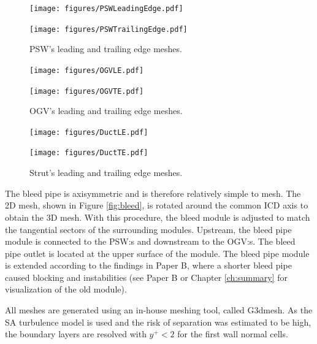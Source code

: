 \begin{figure}[h!]
  \centering
  \begin{minipage}{0.49\columnwidth}
  \texttt{[image: figures/PSWLeadingEdge.pdf]}
  \end{minipage}
  \begin{minipage}{0.49\columnwidth}
  \texttt{[image: figures/PSWTrailingEdge.pdf]}
  \end{minipage}
  \caption{PSW's leading and trailing edge meshes.} \label{fig:meshPSW}
\end{figure}
\begin{figure}[h!]
  \begin{minipage}{0.49\columnwidth}
  \texttt{[image: figures/OGVLE.pdf]}
  \end{minipage}
  \begin{minipage}{0.49\columnwidth}
  \texttt{[image: figures/OGVTE.pdf]}
  \end{minipage}
  \caption{OGV's leading and trailing edge meshes.} \label{fig:meshOGV}
\end{figure}
\begin{figure}[h!]
  \begin{minipage}{0.49\columnwidth}
  \texttt{[image: figures/DuctLE.pdf]}
  \end{minipage}
  \begin{minipage}{0.49\columnwidth}
  \texttt{[image: figures/DuctTE.pdf]}
  \end{minipage}  
  \caption{Strut's leading and trailing edge meshes.} \label{fig:meshDuct}
\end{figure}
The bleed pipe is axisymmetric and is therefore relatively simple to mesh. The 2D mesh, shown in Figure \ref{fig:bleed}, is rotated around the common ICD axis to obtain the 3D mesh. With this procedure, the bleed module is adjusted to match the tangential sectors of the surrounding modules. Upstream, the bleed pipe module is connected to the PSW:s and downstream to the OGV:s. The bleed pipe outlet is located at the upper surface of the module. The bleed pipe module is extended according to the findings in Paper B, where a shorter bleed pipe caused blocking and instabilities (see Paper B or Chapter \ref{ch:summary} for visualization of the old module). 

All meshes are generated using an in-house meshing tool, called G3dmesh. As the SA turbulence model is used and the risk of separation was estimated to be high, the boundary layers are resolved with $y^+<2$ for the first wall normal cells.

